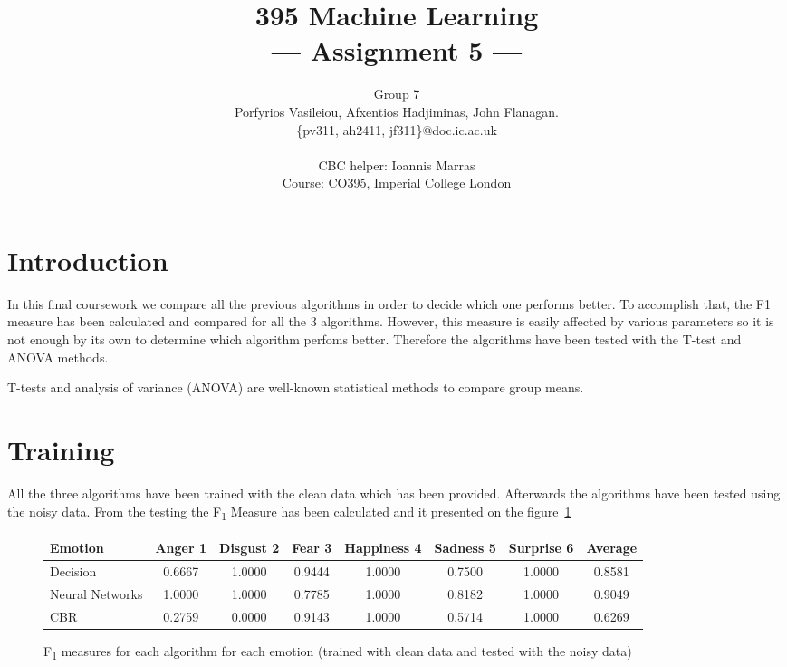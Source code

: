 \documentclass[a4paper,11pt]{article}
\title{395 Machine Learning\\\Large{--- Assignment 5 ---}}
\author{Group 7\\Porfyrios Vasileiou, Afxentios Hadjiminas, John Flanagan.\\
       \{pv311, ah2411, jf311\}@doc.ic.ac.uk\\ \\
       \small{CBC helper: Ioannis Marras}\\
       \small{Course: CO395, Imperial College London}
}
\begin{document}
\maketitle

\section{Introduction}

In this final coursework we compare all the previous algorithms in order to
decide which one performs better. To accomplish that, the F1 measure has been
calculated and compared for all the 3 algorithms. However, this measure is
easily affected by various parameters so it is not enough by its own to
determine which algorithm perfoms better. Therefore the algorithms have been
tested with the T-test and ANOVA methods. 

T-tests and analysis of variance (ANOVA) are well-known statistical methods to
compare group means.

\section{Training}

All the three algorithms have been trained with the clean data which has been
provided. Afterwards the algorithms have been tested using the noisy data. From
the testing the F\textsubscript{1}  Measure has been calculated and it
presented on the figure~\ref{fig:F1Measure}

\begin{figure}[h]
\begin{center}
    \begin{tabular}{| l || c | c | c | c | c | c | c | } \hline
        Emotion & Anger 1 & Disgust 2 & Fear 3 & Happiness 4 & Sadness 5 & Surprise 6  & Average \\ \hline \hline
        Decision & 0.6667  & 1.0000 & 0.9444 & 1.0000 & 0.7500  & 1.0000 & 0.8581\\ \hline
        Neural Networks & 1.0000 & 1.0000 & 0.7785 & 1.0000 & 0.8182 & 1.0000 & 0.9049 \\ \hline
        CBR & 0.2759  &  0.0000 &  0.9143 & 1.0000 & 0.5714 &  1.0000 & 0.6269 \\ \hline
    \end{tabular}
    \caption{F\textsubscript{1} measures for each algorithm for each emotion (trained with clean data  and tested with the noisy data)}
    \label{fig:F1Measure}
    \end{center}
\end{figure}
\end{document}

